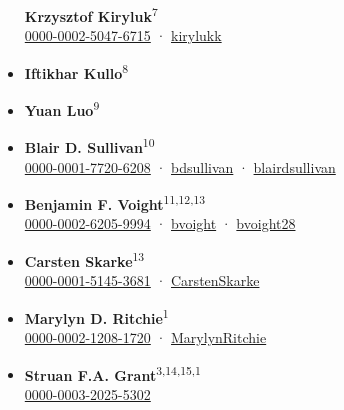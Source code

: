 \documentclass[
  a4paper,
]{article}
\begin{document}
\begin{itemize}
  \textbf{Krzysztof Kiryluk}\textsuperscript{7} \\
  
  \href{https://orcid.org/0000-0002-5047-6715}{0000-0002-5047-6715}
  · 
  \href{https://twitter.com/kirylukk}{kirylukk}
\item
  \textbf{Iftikhar Kullo}\textsuperscript{8}
\item
  \textbf{Yuan Luo}\textsuperscript{9}
\item
  \textbf{Blair D. Sullivan}\textsuperscript{10} \\
  
  \href{https://orcid.org/0000-0001-7720-6208}{0000-0001-7720-6208}
  · 
  \href{https://github.com/bdsullivan}{bdsullivan}
  · 
  \href{https://twitter.com/blairdsullivan}{blairdsullivan}
\item
  \textbf{Benjamin F. Voight}\textsuperscript{11,12,13} \\
  
  \href{https://orcid.org/0000-0002-6205-9994}{0000-0002-6205-9994}
  · 
  \href{https://github.com/bvoight}{bvoight}
  · 
  \href{https://twitter.com/bvoight28}{bvoight28}
\item
  \textbf{Carsten Skarke}\textsuperscript{13} \\
  
  \href{https://orcid.org/0000-0001-5145-3681}{0000-0001-5145-3681}
  · 
  \href{https://twitter.com/CarstenSkarke}{CarstenSkarke}
\item
  \textbf{Marylyn D. Ritchie}\textsuperscript{1} \\
  
  \href{https://orcid.org/0000-0002-1208-1720}{0000-0002-1208-1720}
  · 
  \href{https://twitter.com/MarylynRitchie}{MarylynRitchie}
\item
  \textbf{Struan F.A. Grant}\textsuperscript{3,14,15,1} \\
  
  \href{https://orcid.org/0000-0003-2025-5302}{0000-0003-2025-5302}

\end{itemize}
\end{document}
